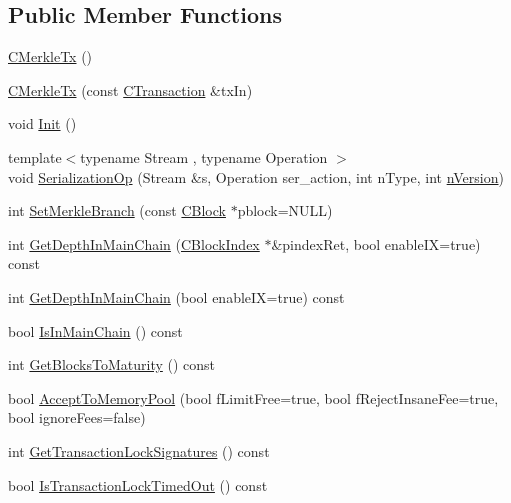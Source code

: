 \subsection*{Public Member Functions}
\begin{DoxyCompactItemize}
\item 
\hyperlink{class_c_merkle_tx_a381bb26e9a8924b8a1311d45dfd18809}{C\+Merkle\+Tx} ()
\item 
\hyperlink{class_c_merkle_tx_aaf4aeddb032c6bb34559fa443bfc3476}{C\+Merkle\+Tx} (const \hyperlink{class_c_transaction}{C\+Transaction} \&tx\+In)
\item 
void \hyperlink{class_c_merkle_tx_ac57628e321f98642976d06b6cc231162}{Init} ()
\item 
{\footnotesize template$<$typename Stream , typename Operation $>$ }\\void \hyperlink{class_c_merkle_tx_afefd3a26c9505f1fa81587c19c22f09c}{Serialization\+Op} (Stream \&s, Operation ser\+\_\+action, int n\+Type, int \hyperlink{class_c_transaction_a6c29bdd822859c7b21b7b6c22dca6825}{n\+Version})
\item 
int \hyperlink{class_c_merkle_tx_a7286c83e09ddaebc6bba39ee38a5a012}{Set\+Merkle\+Branch} (const \hyperlink{class_c_block}{C\+Block} $\ast$pblock=N\+U\+L\+L)
\item 
int \hyperlink{class_c_merkle_tx_a4208943ef656d3787c02ef9973d63f4a}{Get\+Depth\+In\+Main\+Chain} (\hyperlink{class_c_block_index}{C\+Block\+Index} $\ast$\&pindex\+Ret, bool enable\+I\+X=true) const 
\item 
int \hyperlink{class_c_merkle_tx_aa26936095eff1cc6d01b7e2d44cbf8f6}{Get\+Depth\+In\+Main\+Chain} (bool enable\+I\+X=true) const 
\item 
bool \hyperlink{class_c_merkle_tx_adf24748ee829f589ac8d6e99ec6121de}{Is\+In\+Main\+Chain} () const 
\item 
int \hyperlink{class_c_merkle_tx_a8bd25cf06de6a443d0925ec8ba66c949}{Get\+Blocks\+To\+Maturity} () const 
\item 
bool \hyperlink{class_c_merkle_tx_a61126e811a53b941b3efdf5a4e83db90}{Accept\+To\+Memory\+Pool} (bool f\+Limit\+Free=true, bool f\+Reject\+Insane\+Fee=true, bool ignore\+Fees=false)
\item 
int \hyperlink{class_c_merkle_tx_a6782c78aec9fd63e637dbf0668c8506e}{Get\+Transaction\+Lock\+Signatures} () const 
\item 
bool \hyperlink{class_c_merkle_tx_a31b0765b267cab5f76b308d1fe5d9375}{Is\+Transaction\+Lock\+Timed\+Out} () const 
\end{DoxyCompactItemize}
